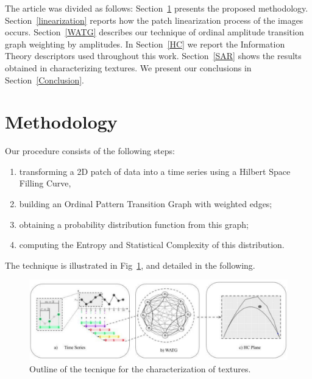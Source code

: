 \documentclass{isprs}
\begin{document}
	
	
	
	The article was divided as follows:
	Section~\ref{methodology} presents the proposed methodology.
	Section~\ref{linearization} reports how the patch linearization process of the images occurs.
	Section~\ref{WATG} describes our technique of ordinal amplitude transition graph weighting by amplitudes.
	In Section~\ref{HC} we report the Information Theory descriptors used throughout this work.
	Section~\ref{SAR} shows the results obtained in characterizing textures.
	We present our conclusions in Section~\ref{Conclusion}.
	
	
	\section{Methodology}\label{methodology}
	
	Our procedure consists of the following steps:
	\begin{enumerate}
		\item\label{item:Linearlize} transforming a 2D patch of data into a time series using a Hilbert Space Filling Curve,
		\item\label{item:WOPTG} building an Ordinal Pattern Transition Graph with weighted edges;
		\item\label{item:Probability} obtaining a probability distribution function from this graph;
		\item\label{item:Descriptors} computing the Entropy and Statistical Complexity of this distribution.
	\end{enumerate}
	The technique is illustrated in Fig~\ref{fig:WATG}, and detailed in the following.
	
	\begin{figure}[hbt]
		\centering
		\includegraphics[scale = 0.5]{Figures/WATG.pdf}
		\caption{Outline of the tecnique for the characterization of textures.}
		\label{fig:WATG}
	\end{figure}
	
\end{document}
